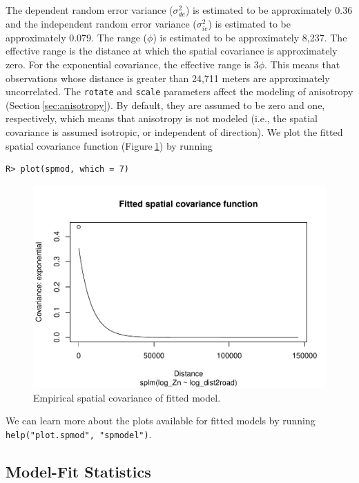 \documentclass{article}
\begin{document}
The dependent random error variance (\(\sigma^2_{de}\)) is estimated to
be approximately 0.36 and the independent random error variance
(\(\sigma^2_{ie}\)) is estimated to be approximately 0.079. The range
(\(\phi\)) is estimated to be approximately 8,237. The effective range
is the distance at which the spatial covariance is approximately zero.
For the exponential covariance, the effective range is \(3\phi\). This
means that observations whose distance is greater than 24,711 meters are
approximately uncorrelated. The \texttt{rotate} and \texttt{scale}
parameters affect the modeling of anisotropy
(Section\(~\)\ref{sec:anisotropy}). By default, they are assumed to be
zero and one, respectively, which means that anisotropy is not modeled
(i.e., the spatial covariance is assumed isotropic, or independent of
direction). We plot the fitted spatial covariance function
(Figure\(~\)\ref{fig:emp_spcov}) by running

\begin{verbatim}
R> plot(spmod, which = 7)
\end{verbatim}

\begin{figure}

{\centering \includegraphics[width=0.75\linewidth]{preprint_files/figure-latex/emp_spcov-1} 

}

\caption{Empirical spatial covariance of fitted model.}\label{fig:emp_spcov}
\end{figure}

We can learn more about the plots available for fitted models by running
\texttt{help("plot.spmod",\ "spmodel")}.

\hypertarget{model-fit-statistics}{%
\subsection{Model-Fit Statistics}\label{model-fit-statistics}}
\end{document}
